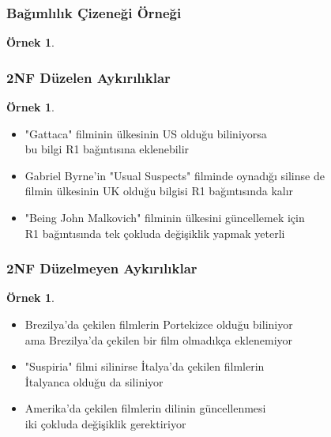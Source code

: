 \documentclass[dvipsnames]{beamer}
\theoremstyle{definition}
\theoremstyle{example}
\newtheorem{ornek}[theorem]{Örnek}
\theoremstyle{plain}
\begin{document}
\begin{frame}
  \frametitle{Bağımlılık Çizeneği Örneği}

  \begin{ornek}
    \begin{center}
    \end{center}
  \end{ornek}
\end{frame}

\begin{frame}
  \frametitle{2NF Düzelen Aykırılıklar}

  \begin{ornek}
    \begin{itemize}
      \item "Gattaca" filminin ülkesinin US olduğu biliniyorsa\\
	bu bilgi R1 bağıntısına eklenebilir

      \pause
      \item Gabriel Byrne'in "Usual Suspects" filminde oynadığı silinse de\\
        filmin ülkesinin UK olduğu bilgisi R1 bağıntısında kalır

      \pause
      \item "Being John Malkovich" filminin ülkesini güncellemek için\\
        R1 bağıntısında tek çokluda değişiklik yapmak yeterli
    \end{itemize}
  \end{ornek}
\end{frame}

\begin{frame}
  \frametitle{2NF Düzelmeyen Aykırılıklar}

  \begin{ornek}
    \begin{itemize}
      \item Brezilya'da çekilen filmlerin Portekizce olduğu biliniyor\\
	ama Brezilya'da çekilen bir film olmadıkça eklenemiyor

      \pause
      \item "Suspiria" filmi silinirse İtalya'da çekilen filmlerin\\
        İtalyanca olduğu da siliniyor

      \pause
      \item Amerika'da çekilen filmlerin dilinin güncellenmesi\\
        iki çokluda değişiklik gerektiriyor
    \end{itemize}
  \end{ornek}
\end{frame}
\end{document}
